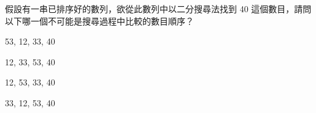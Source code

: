 \ifx\ntpcNinetyTwo\undefined[92學年基北區] \fi
假設有一串已排序好的數列，欲從此數列中以二分搜尋法找到 40 這個數目，請問以下哪一個不可能是搜尋過程中比較的數目順序？
  \begin{optionlist}
  \item 53, 12, 33, 40
  \item 12, 33, 53, 40
  \item 12, 53, 33, 40
  \item 33, 12, 53, 40\label{ntpc-92-a40}
  \end{optionlist}